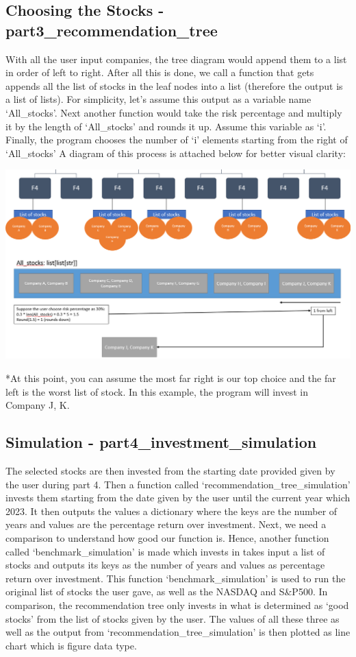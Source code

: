 \documentclass[fontsize=11pt]{article}
\begin{document}
\subsection{Choosing the Stocks - part3\_recommendation\_tree}
With all the user input companies, the tree diagram would append them to a list in order of left to right. After all this is done, we call a function that gets appends all the list of stocks in the leaf nodes into  a list (therefore the output is a list of lists). For simplicity, let's assume this output as a variable name `All\_stocks'. Next another function would take the risk percentage and multiply it by the length of `All\_stocks' and rounds it up. Assume this variable as `i'. Finally, the program chooses the number of `i' elements starting from the right of `All\_stocks' A diagram of this process is attached below for better visual clarity:
\begin{center}
\includegraphics[scale=0.65]{choosing_stocks.png}
\end{center}
*At this point, you can assume the most far right is our top choice and the far left is the worst list of stock. In this example, the program will invest in Company J, K.

\subsection{Simulation - part4\_investment\_simulation}
The selected stocks are then invested from the starting date provided  given by the user during part 4. Then a function called `recommendation\_tree\_simulation' invests them starting from the date given by the user until the current year which 2023. It then outputs the values a dictionary where the keys are the number of years and values are the percentage return over investment. Next, we need a comparison to understand how good our function is. Hence, another function called `benchmark\_simulation' is made which invests in takes input a list of stocks and outputs its keys as the number of years and values as percentage return over investment. 
This function `benchmark\_simulation' is used to run the original list of stocks the user gave, as well as the NASDAQ and S\&P500. In comparison, the recommendation tree only invests in what is determined as `good stocks' from the list of stocks given by the user. The values of all these three as well as the output from `recommendation\_tree\_simulation' is then plotted as line chart which is figure data type.
\end{document}
